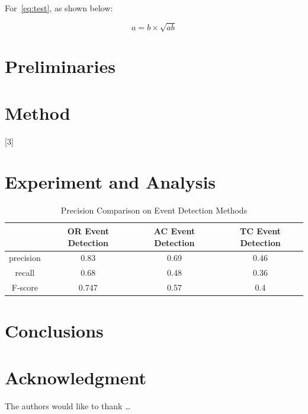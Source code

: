 For~\cref{eq:test},
as shown below:

\begin{equation}\label{eq:test}
a = b \times \sqrt{ab}
\end{equation}

\blindmathpaper

\section{Preliminaries} \label{sec-preliminaries}

\blindtext

\gliMarker  %


\section{Method} \label{sec-method}

\blindtext
{}[3]
\blinditemize
\blindenumerate

\blindmathtrue
\blindmathfalse
\blinddescription

\qwuMarker %

\section{Experiment and Analysis} \label{sec-experiment}


\begin{table}  \centering
  \caption{Precision Comparison on Event Detection Methods}
  \label{tbl:overall-experiments}
  \begin{tabular}{cccc}
\toprule
    & OR Event Detection & AC Event Detection & TC Event Detection \\
\midrule
    precision & 0.83 & 0.69 & 0.46 \\
    recall & 0.68 & 0.48 & 0.36 \\
    F-score & 0.747 & 0.57 & 0.4 \\
\bottomrule
\end{tabular}
\end{table}


\section{Conclusions} \label{sec-conclusions}

\blindtext

\section*{Acknowledgment}

\lipsum[1]


The authors would like to thank \ldots

